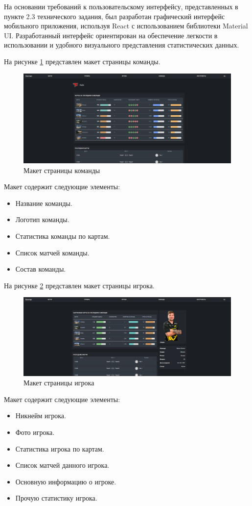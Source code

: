 На основании требований к пользовательскому интерфейсу, представленных в пункте 2.3 технического задания, был разработан графический интерфейс мобильного приложения, используя React с использованием библиотеки Material UI. Разработанный интерфейс ориентирован на обеспечение легкости в использовании и удобного визуального представления статистических данных.

На рисунке \ref{fig:-teamPage} представлен макет страницы команды.
\begin{figure}
	\centering
	\includegraphics[width=0.8\linewidth]{"images/Страница команды"}
	\caption{Макет страницы команды}
	\label{fig:-teamPage}
\end{figure}

Макет содержит следующие элементы:
\begin{itemize}
	\item Название команды.
	\item Логотип команды.
	\item Статистика команды по картам.
	\item Список матчей команды.
	\item Состав команды.
\end{itemize}

На рисунке \ref{fig:-playerPage} представлен макет страницы игрока.
\begin{figure}
	\centering
	\includegraphics[width=0.8\linewidth]{"images/Страница игрока"}
	\caption{Макет страницы игрока}
	\label{fig:-playerPage}
\end{figure}

Макет содержит следующие элементы:
\begin{itemize}
	\item Никнейм игрока.
	\item Фото игрока.
	\item Статистика игрока по картам.
	\item Список матчей данного игрока.
	\item Основную информацию о игроке.
	\item Прочую статистику игрока.
\end{itemize}

